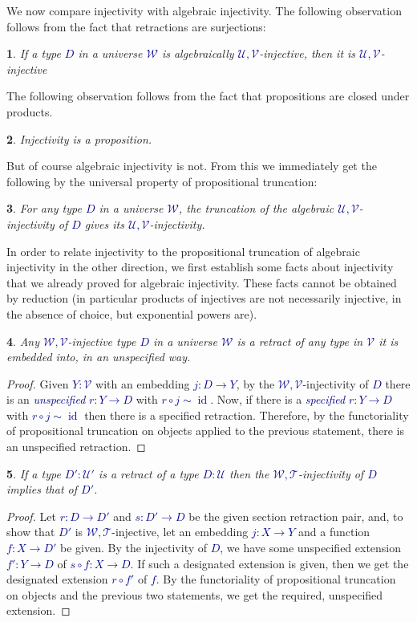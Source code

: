 \documentclass[10pt]{article}
\newcommand{\db}{\textcolor{darkblue}}
\newcommand{\df}[1]{\emph{\db{#1}}}
\newcommand{\m}[1]{\db{$#1$}}
\newcommand{\id}{\operatorname{id}}
\newcommand{\comp}{\mathrel{\circ}}
\newcommand{\U}{\mathcal{U}}
\newcommand{\V}{\mathcal{V}}
\newcommand{\W}{\mathcal{W}}
\newcommand{\T}{\mathcal{T}}
\newtheorem{numbered}{}
\theoremstyle{definition}
\begin{document}
We now compare injectivity with algebraic injectivity. The following observation follows from the fact that retractions are surjections:
\begin{numbered}
  If a type \m{D} in a universe \m{\W} is algebraically
  \m{\U,\V}-injective, then it is \m{\U,\V}-injective
\end{numbered}
\noindent The following observation follows from the fact that propositions are
closed under products.
\begin{numbered}
  Injectivity is a proposition.
\end{numbered}
\noindent But of course algebraic injectivity is not. From this we immediately
get the following by the universal property of propositional
truncation:

\begin{numbered}
  For any type \m{D} in a universe \m{\W}, the truncation of the
  algebraic \m{\U,\V}-injectivity of \m{D} gives its
  \m{\U,\V}-injectivity.
\end{numbered}

In order to relate injectivity to the propositional truncation of
algebraic injectivity in the other direction, we first establish some
facts about injectivity that we already proved for algebraic
injectivity. These facts cannot be obtained by reduction (in
particular products of injectives are not necessarily injective, in
the absence of choice, but exponential powers are).

\begin{numbered}
  Any \m{\W,\V}-injective type \m{D} in a universe \m{\W} is a retract
  of any type in \m{\V} it is embedded into, in an unspecified way.
\end{numbered}
\begin{proof}
  Given \m{Y:\V} with an embedding \m{j : D \to Y}, by the
  \m{\W,\V}-injectivity of \m{D} there is an \df{unspecified} \m{r : Y
    \to D} with \m{r \comp j \sim \id}. Now, if there is a
  \df{specified} \m{r : Y \to D} with \m{r \comp j \sim \id} then
  there is a specified retraction. Therefore, by the functoriality of
  propositional truncation on objects applied to the previous
  statement, there is an unspecified retraction.
\end{proof}

\begin{numbered}
  If a type \m{D' : \U'} is a retract of a type \m{D : \U} then the \m{\W,\T}-injectivity of
  \m{D} implies that of \m{D'}.
\end{numbered}
\begin{proof}
  Let \m{r : D \to D'} and \m{s : D' \to D} be the given section
  retraction pair, and, to show that \m{D'} is \m{\W,\T}-injective,
  let an embedding \m{j : X \to Y} and a function \m{f : X \to D'} be
  given. By the injectivity of \m{D}, we have some unspecified
  extension \m{f' : Y \to D} of \m{s \comp f : X \to D}.  If such a
  designated extension is given, then we get the designated extension
  \m{r \comp f'} of \m{f}. By the functoriality of propositional
  truncation on objects and the previous two statements, we get the
  required, unspecified extension.
\end{proof}
\end{document}
